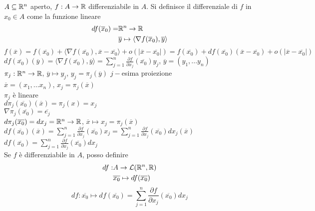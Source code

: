 $A \subseteq \mathbb{R}^n$ aperto, $f:A \rightarrow \mathbb{R}$ differenziabile in $A$. Si definisce il differenziale di $f$ in $x_0 \in A$ come la funzione lineare 
\begin{align*}
	df(\overline{x}_0)=&\mathbb{R}^n\rightarrow\mathbb{R}\\
	&\overline{y}\mapsto \langle \nabla f(\overline{x}_0),\overline{y} \rangle
\end{align*}
$f(\overline{x})=f(\overline{x_0})+\langle \nabla f (\overline{x_0}),\overline{x}-\overline{x_0} \rangle + o(|\overline{x}-\overline{x_0}|)=f(\overline{x_0})+df(\overline{x_0})(\overline{x}-\overline{x_0})+o(|\overline{x}-\overline{x_0}|)$\\
$df(\overline{x_0})(\overline{y})=\langle \nabla f (\overline{x_0}),\overline{y}\rangle =\sum_{j=1}^n\frac{\partial f}{\partial x_j}(\overline{x_0})y_j$, $\overline{y}=(y_1,...y_n)$\\
$\pi_j: \mathbb{R}^n \rightarrow \mathbb{R}$, $\overline{y}\mapsto y_j$, $y_j=\pi_j(\overline{y})$ $j-$esima proiezione\\
$\overline{x}=(x_1,...x_n)$, $x_j=\pi_j(\overline{x})$\\
$\pi_j$ è lineare\\
$d \pi_j (\overline{x_0})(\overline{x})=\pi_j(x)=x_j$\\
$\nabla \pi_j (\overline{x_0})=\overline{e_j}$\\
$d \pi _j (\overline{x_0})=dx_j= \mathbb{R}^n \rightarrow \mathbb{R}$, $\overline{x} \mapsto x_j=\pi_j(\overline{x})$\\
$df(\overline{x_0})(\overline{x})=\sum_{j=1}^n \frac{\partial f}{\partial x_j}(\overline{x_0})x_j=\sum_{j=1}^n \frac{\partial f}{\partial x_j}(\overline{x_0})dx_j(\overline{x})$\\
$df(\overline{x_0})=\sum_{j=1}^n \frac{\partial f}{\partial x_j} (\overline{x_0})dx_j$\\
Se $f$ è differenziabile in $A$, posso definire
\begin{align*}
	df: &A \rightarrow \mathcal{L}(\mathbb{R}^n,\mathbb{R})\\
	&\overline{x_0} \mapsto df(\overline{x_0})
\end{align*}
\begin{equation*}
	df: \overline{x_0} \mapsto df(\overline{x_0})=\sum_{j=1}^n \frac{\partial f}{\partial x_j}(\overline{x_0})dx_j
\end{equation*}


